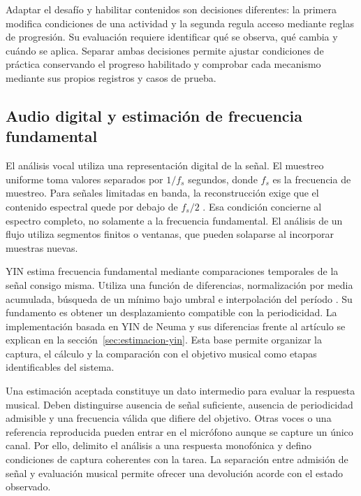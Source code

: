 Adaptar el desafío y habilitar contenidos son decisiones diferentes: la primera
modifica condiciones de una actividad y la segunda regula acceso mediante reglas
de progresión. Su evaluación requiere identificar qué se observa, qué cambia y
cuándo se aplica. Separar ambas decisiones permite ajustar condiciones de práctica
conservando el progreso habilitado y comprobar cada mecanismo mediante sus
propios registros y casos de prueba.

\subsection{Audio digital y estimación de frecuencia fundamental}
\label{sec:audio-estimacion}
\label{sec:muestreo-audio}
El análisis vocal utiliza una representación digital de la señal. El muestreo
uniforme toma valores separados por \(1/f_s\) segundos, donde \(f_s\) es la frecuencia
de muestreo. Para señales limitadas en banda, la reconstrucción exige que el
contenido espectral quede por debajo de \(f_s/2\)
\parencite[apéndice~D, Sampling Theorem]{smithMuestreo}. Esa condición concierne
al espectro completo, no solamente a la frecuencia fundamental. El análisis de un
flujo utiliza segmentos finitos o ventanas, que pueden solaparse al incorporar
muestras nuevas.

YIN estima frecuencia fundamental mediante comparaciones temporales de la señal
consigo misma. Utiliza una función de diferencias, normalización por media
acumulada, búsqueda de un mínimo bajo umbral e interpolación del período
\parencite[pp.~1919--1921]{decheveigne2002yin}. Su fundamento es obtener un
desplazamiento compatible con la periodicidad. La implementación basada en YIN de
Neuma y sus diferencias frente al artículo se explican en la
sección~\ref{sec:estimacion-yin}. Esta base permite organizar la captura, el cálculo
y la comparación con el objetivo musical como etapas identificables del sistema.

Una estimación aceptada constituye un dato intermedio para evaluar la respuesta
musical. Deben distinguirse ausencia de señal suficiente, ausencia de periodicidad
admisible y una frecuencia válida que difiere del objetivo. Otras voces o una
referencia reproducida pueden entrar en el micrófono aunque se capture un único
canal. Por ello, delimito el análisis a una respuesta monofónica y defino
condiciones de captura coherentes con la tarea. La separación entre admisión
de señal y evaluación musical permite ofrecer una devolución acorde con el
estado observado.

